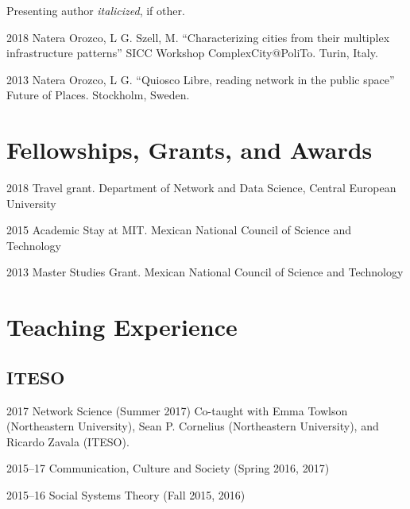 \documentclass{academiccv}
\begin{document}
Presenting author \textit{italicized}, if other.\bigskip

\begin{tablist}

\item[2018] \tab Natera Orozco, L G. Szell, M. \enquote{Characterizing cities from their multiplex infrastructure patterns} SICC Workshop ComplexCity@PoliTo. Turin, Italy.

\item[2013] \tab Natera Orozco, L G. \enquote{Quiosco Libre, reading network in the public space} Future of Places. Stockholm, Sweden.

\end{tablist}



\section*{Fellowships, Grants, and Awards}

\begin{tablist}

\item[2018] \tab Travel grant. Department of Network and Data Science, Central European University

\item[2015] \tab Academic Stay at MIT. Mexican National Council of Science and Technology 

\item[2013] \tab Master Studies Grant. Mexican National Council of Science and Technology

\end{tablist}



\section*{Teaching Experience}

\subsection*{ITESO}

\begin{tablist}
	
	\item[2017]	\tab Network Science (Summer 2017) Co-taught with Emma Towlson (Northeastern University), Sean P. Cornelius (Northeastern University), and Ricardo Zavala (ITESO).
	
	\item [2015--17]\tab Communication, Culture and Society (Spring 2016, 2017)
	
	\item [2015--16]\tab Social Systems Theory (Fall 2015, 2016)
	
	
\end{tablist}
\end{document}
